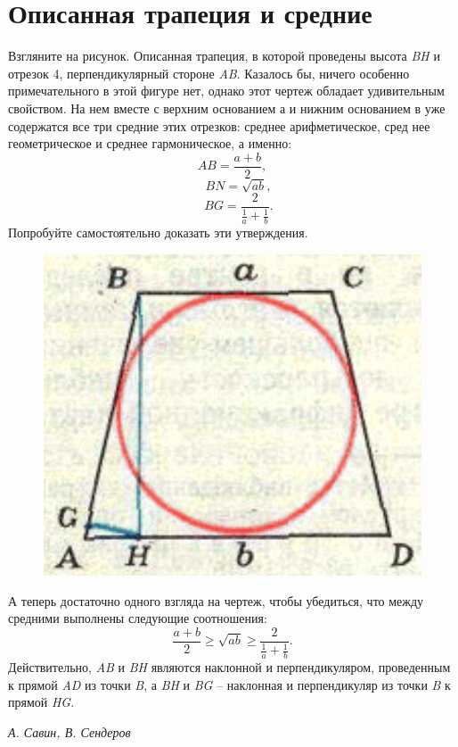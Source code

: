 \documentclass[a4paper, 11pt]{article}
\begin{document}
    \begin{minipage}[t]{0.3\textwidth} %
        \titleformat{\section}{\filcenter\Large\bfseries}{}{}{}
        \section*{Описанная трапеция и средние}
        Взгляните на рисунок. Описанная трапеция, в которой проведены высота \textit{BH} и отрезок 4, перпендикулярный стороне \textit{AB}. Казалось бы, ничего особенно примечательного в этой фигуре нет, однако этот чертеж обладает удивительным свойством. На нем вместе с верхним основанием а и нижним основанием в уже содержатся все три средние этих отрезков: среднее арифметическое, сред нее геометрическое и среднее гармоническое, а именно:\[AB = \frac{a+b}{2},\] \[\quad BN = \sqrt{ab},\] \[\quad BG = \frac{2}{\frac{1}{a}+\frac{1}{b}}.\]
        Попробуйте самостоятельно доказать эти утверждения.
        \begin{figure}[H]
            \setcounter{figure}{13}
            \centering
            \includegraphics[width=1\columnwidth]{2.png}
        \end{figure}
        А теперь достаточно одного взгляда на чертеж, чтобы убедиться, что между средними выполнены следующие соотношения:
        \[ \frac{a+b}{2} \geq \sqrt{ab} \geq \frac{2}{\frac{1}{a}+\frac{1}{b}}.\]
        Действительно, \textit{AB} и \textit{BH} являются наклонной и перпендикуляром, проведенным к прямой \textit{AD} из точки \textit{B}, а \textit{BH} и \textit{BG} -- наклонная и перпендикуляр из точки \textit{B} к прямой \textit{HG}.
        
        {\textit{А. Савин, В. Сендеров}}\raggedleft
    \end{minipage}
\end{document}
